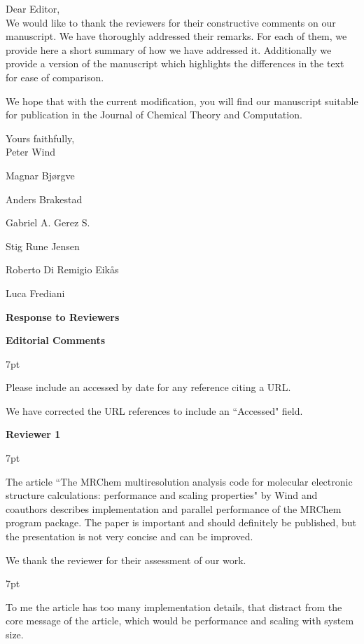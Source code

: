 \documentclass[11pt]{article}
\newenvironment{formal}{%
  \def\FrameCommand{%
    \hspace{1pt}%
    {\color{darkblue}\vrule width 2pt}%
    {\color{formalshade}\vrule width 4pt}%
    \colorbox{formalshade}%
  }%
  \MakeFramed{\advance\hsize-\width\FrameRestore}%
  \noindent\hspace{-4.55pt}%
  \begin{adjustwidth}{}{7pt}%
  \vspace{2pt}\vspace{2pt}%
}
{%
  \vspace{2pt}\end{adjustwidth}\endMakeFramed%
}
\begin{document}
Dear Editor,\\

We would like to thank the reviewers for their constructive comments on our manuscript. We have thoroughly addressed their remarks. For each of them, we provide here a short summary of how we have addressed it. Additionally we provide a version of the manuscript which highlights the differences in the text for ease of comparison.

We hope that with the current modification, you will find our manuscript suitable for publication in the Journal of Chemical Theory and Computation.

Yours faithfully,
\\

Peter Wind

Magnar Bj{\o}rgve 

Anders Brakestad

Gabriel A. Gerez S.

Stig Rune Jensen 

Roberto Di Remigio Eik{\aa}s

Luca Frediani

\clearpage

{\Large \bf Response to Reviewers}

\vspace{1em}

{\bf Editorial Comments}

\begin{formal}
Please include an accessed by date for any reference citing a URL.
\end{formal}

We have corrected the URL references to include an ``Accessed" field.

\clearpage

{\bf Reviewer 1}

\begin{formal}
The article ``The MRChem multiresolution analysis code for molecular electronic structure calculations: performance and scaling properties" by Wind and coauthors describes implementation and parallel performance of the MRChem program package. The paper is important and should definitely be published, but the presentation is not very concise and can be improved.
\end{formal}

We thank the reviewer for their assessment of our work.

\begin{formal}
To me the article has too many implementation details, that distract from the core message of the article, which would be performance and scaling with system size.
\end{formal}
\end{document}
